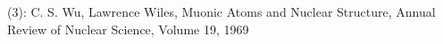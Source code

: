 \documentclass[preview]{standalone}
\begin{document}
\begin{center}
(3): C. S. Wu, Lawrence Wiles, Muonic Atoms and Nuclear Structure, Annual Review of Nuclear Science, Volume 19, 1969
\end{center}
\end{document}
